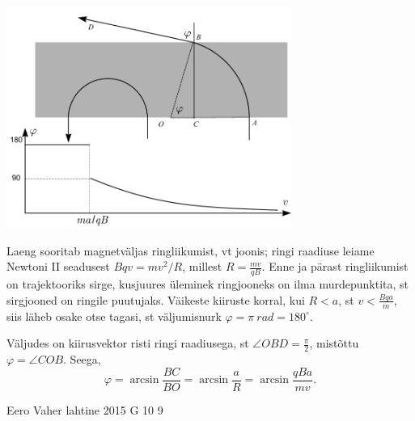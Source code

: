 \documentclass[11pt]{article}
\begin{document}
{{\ifSolution
\begin{center}
\includegraphics[width=0.7\textwidth]{2015-v2g-09-magnetvalilah}
\end{center}
Laeng sooritab magnetväljas ringliikumist, vt joonis;
ringi raadiuse leiame Newtoni II seadusest $Bqv=mv^2/R$, millest
$R=\frac{mv}{qB}$. Enne ja pärast ringliikumist on trajektooriks sirge, kusjuures üleminek ringjooneks on ilma murdepunktita, st sirgjooned on ringile puutujaks. Väikeste kiiruste korral, kui $R<a$, st $v<\frac{Bqa}{m}$, siis läheb osake otse tagasi,
st väljumisnurk $\varphi=\pi \SI{}{rad}=180^\circ$.

Väljudes on kiirusvektor risti ringi raadiusega, st $\angle OBD=\frac \pi 2$, mistõttu $\varphi=\angle COB$. Seega,
\[
\varphi=\arcsin \frac{BC}{BO}=\arcsin \frac{a}{R}=\arcsin \frac{qBa}{mv}.
\]
\fi
}

{Eero Vaher} %
{lahtine} %
{2015} %
{G 10} %
{9} %
{

}}
\end{document}
